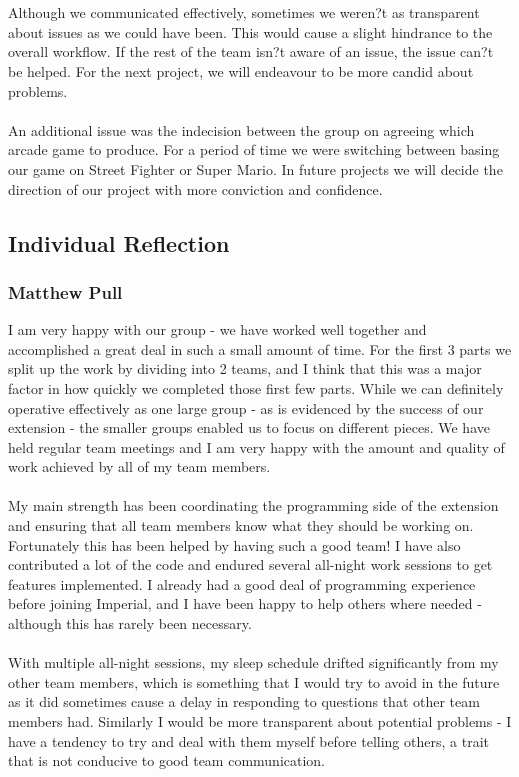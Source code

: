 \documentclass[11pt,twoside]{article}
\begin{document}
\\\\
Although we communicated effectively, sometimes we weren?t as transparent about issues as we could have been. This would cause a slight hindrance to the overall workflow. If the rest of the team isn?t aware of an issue, the issue can?t be helped. For the next project, we will endeavour to be more candid about problems.
\\\\
An additional issue was the indecision between the group on agreeing which arcade game to produce. For a period of time we were switching between basing our game on Street Fighter or Super Mario. In future projects we will decide the direction of our project with more conviction and confidence.

\subsection{Individual Reflection}
\subsubsection{Matthew Pull}
I am very happy with our group - we have worked well together and accomplished a great deal in such a small amount of time. For the first 3 parts we split up the work by dividing into 2 teams, and I think that this was a major factor in how quickly we completed those first few parts. While we can definitely operative effectively as one large group - as is evidenced by the success of our extension - the smaller groups enabled us to focus on different pieces. We have held regular team meetings and I am very happy with the amount and quality of work achieved by all of my team members.
\\\\
My main strength has been coordinating the programming side of the extension and ensuring that all team members know what they should be working on. Fortunately this has been helped by having such a good team! I have also contributed a lot of the code and endured several all-night work sessions to get features implemented. I already had a good deal of programming experience before joining Imperial, and I have been happy to help others where needed - although this has rarely been necessary.
\\\\
With multiple all-night sessions, my sleep schedule drifted significantly from my other team members, which is something that I would try to avoid in the future as it did sometimes cause a delay in responding to questions that other team members had. Similarly I would be more transparent about potential problems - I have a tendency to try and deal with them myself before telling others, a trait that is not conducive to good team communication.
\end{document}
